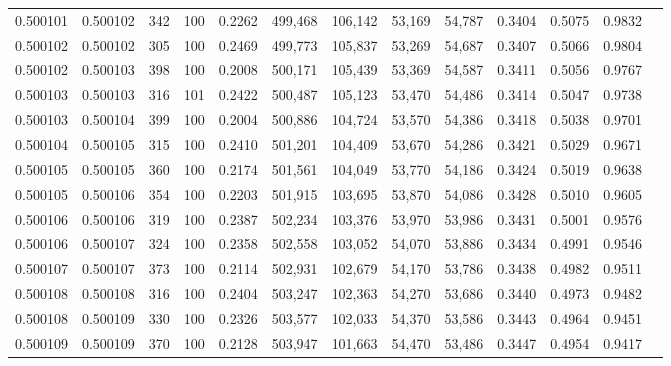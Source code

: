 \begin{tabular}{rrrrrrrrrrrrr}
0.500101 & 0.500102 &   342 & 100 &                                     0.2262 & 499,468 & 106,142 &  53,169 &  54,787 & 0.3404 & 0.5075 & 0.9832 \\
0.500102 & 0.500102 &   305 & 100 &                                     0.2469 & 499,773 & 105,837 &  53,269 &  54,687 & 0.3407 & 0.5066 & 0.9804 \\
0.500102 & 0.500103 &   398 & 100 &                                     0.2008 & 500,171 & 105,439 &  53,369 &  54,587 & 0.3411 & 0.5056 & 0.9767 \\
0.500103 & 0.500103 &   316 & 101 &                                     0.2422 & 500,487 & 105,123 &  53,470 &  54,486 & 0.3414 & 0.5047 & 0.9738 \\
0.500103 & 0.500104 &   399 & 100 &                                     0.2004 & 500,886 & 104,724 &  53,570 &  54,386 & 0.3418 & 0.5038 & 0.9701 \\
0.500104 & 0.500105 &   315 & 100 &                                     0.2410 & 501,201 & 104,409 &  53,670 &  54,286 & 0.3421 & 0.5029 & 0.9671 \\
0.500105 & 0.500105 &   360 & 100 &                                     0.2174 & 501,561 & 104,049 &  53,770 &  54,186 & 0.3424 & 0.5019 & 0.9638 \\
0.500105 & 0.500106 &   354 & 100 &                                     0.2203 & 501,915 & 103,695 &  53,870 &  54,086 & 0.3428 & 0.5010 & 0.9605 \\
0.500106 & 0.500106 &   319 & 100 &                                     0.2387 & 502,234 & 103,376 &  53,970 &  53,986 & 0.3431 & 0.5001 & 0.9576 \\
0.500106 & 0.500107 &   324 & 100 &                                     0.2358 & 502,558 & 103,052 &  54,070 &  53,886 & 0.3434 & 0.4991 & 0.9546 \\
0.500107 & 0.500107 &   373 & 100 &                                     0.2114 & 502,931 & 102,679 &  54,170 &  53,786 & 0.3438 & 0.4982 & 0.9511 \\
0.500108 & 0.500108 &   316 & 100 &                                     0.2404 & 503,247 & 102,363 &  54,270 &  53,686 & 0.3440 & 0.4973 & 0.9482 \\
0.500108 & 0.500109 &   330 & 100 &                                     0.2326 & 503,577 & 102,033 &  54,370 &  53,586 & 0.3443 & 0.4964 & 0.9451 \\
0.500109 & 0.500109 &   370 & 100 &                                     0.2128 & 503,947 & 101,663 &  54,470 &  53,486 & 0.3447 & 0.4954 & 0.9417 \\

\end{tabular}
